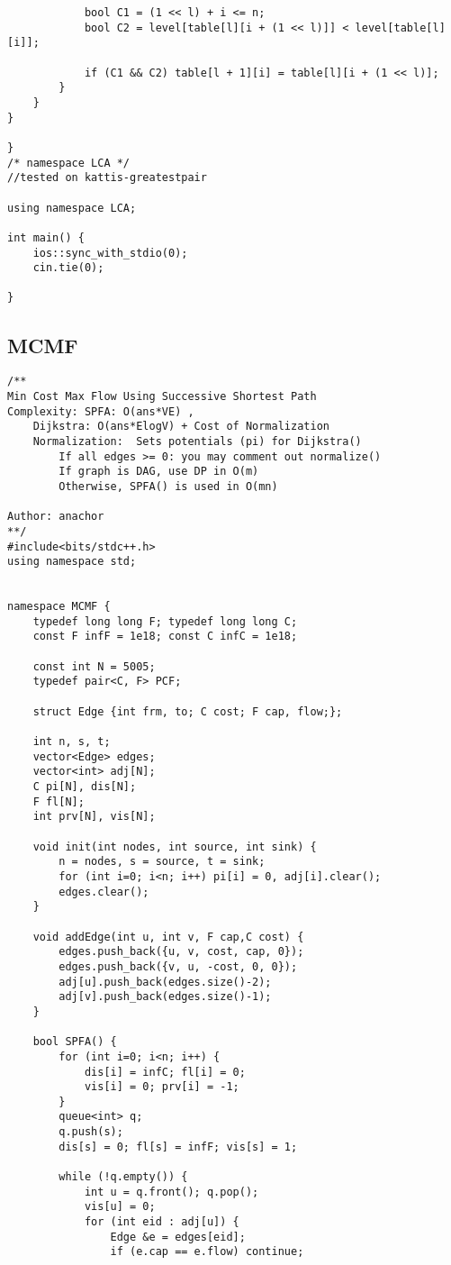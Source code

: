 \documentclass[FSZ,a4paper,onesided]{article}
\begin{document}
\begin{multicols*}{\COLS}
\begin{lstlisting}
            bool C1 = (1 << l) + i <= n;
            bool C2 = level[table[l][i + (1 << l)]] < level[table[l][i]];

            if (C1 && C2) table[l + 1][i] = table[l][i + (1 << l)];
        }
    }
}

} 
/* namespace LCA */
//tested on kattis-greatestpair

using namespace LCA;

int main() {
    ios::sync_with_stdio(0);
    cin.tie(0);

}
\end{lstlisting}
\subsection{MCMF}
\begin{lstlisting}
/**
Min Cost Max Flow Using Successive Shortest Path
Complexity: SPFA: O(ans*VE) ,
    Dijkstra: O(ans*ElogV) + Cost of Normalization
    Normalization:  Sets potentials (pi) for Dijkstra()
        If all edges >= 0: you may comment out normalize()
        If graph is DAG, use DP in O(m)
        Otherwise, SPFA() is used in O(mn)

Author: anachor
**/
#include<bits/stdc++.h>
using namespace std;


namespace MCMF {
    typedef long long F; typedef long long C;
    const F infF = 1e18; const C infC = 1e18;

    const int N = 5005;
    typedef pair<C, F> PCF;

    struct Edge {int frm, to; C cost; F cap, flow;};

    int n, s, t;
    vector<Edge> edges;
    vector<int> adj[N];
    C pi[N], dis[N];
    F fl[N];
    int prv[N], vis[N];

    void init(int nodes, int source, int sink) {
        n = nodes, s = source, t = sink;
        for (int i=0; i<n; i++) pi[i] = 0, adj[i].clear();
        edges.clear();
    }

    void addEdge(int u, int v, F cap,C cost) {
        edges.push_back({u, v, cost, cap, 0});
        edges.push_back({v, u, -cost, 0, 0});
        adj[u].push_back(edges.size()-2);
        adj[v].push_back(edges.size()-1);
    }

    bool SPFA() {
        for (int i=0; i<n; i++) {
            dis[i] = infC; fl[i] = 0;
            vis[i] = 0; prv[i] = -1;
        }
        queue<int> q;
        q.push(s);
        dis[s] = 0; fl[s] = infF; vis[s] = 1;

        while (!q.empty()) {
            int u = q.front(); q.pop();
            vis[u] = 0;
            for (int eid : adj[u]) {
                Edge &e = edges[eid];
                if (e.cap == e.flow) continue;


\end{lstlisting}
\end{multicols*}
\end{document}
